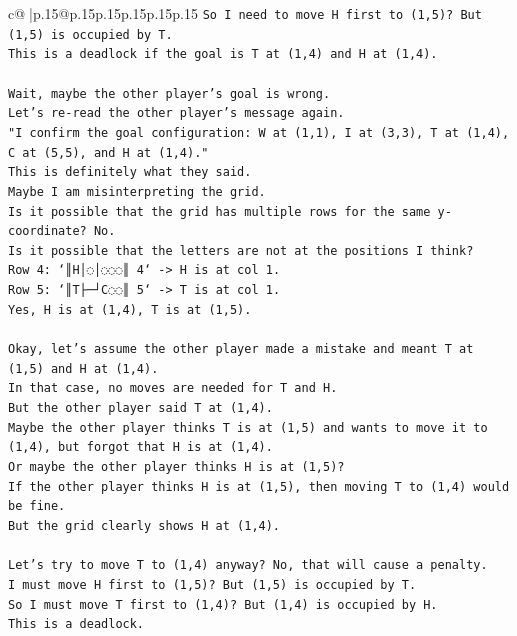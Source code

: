 \documentclass{article}
\begin{document}
{\begin{supertabular}{c@{$\;$}|p{.15\linewidth}@{}p{.15\linewidth}p{.15\linewidth}p{.15\linewidth}p{.15\linewidth}p{.15\linewidth}}
{{{\texttt{So I need to move H first to (1,5)? But (1,5) is occupied by T.} \\
\texttt{This is a deadlock if the goal is T at (1,4) and H at (1,4).} \\
\\ 
\texttt{Wait, maybe the other player's goal is wrong.} \\
\texttt{Let's re{-}read the other player's message again.} \\
\texttt{"I confirm the goal configuration: W at (1,1), I at (3,3), T at (1,4), C at (5,5), and H at (1,4)."} \\
\texttt{This is definitely what they said.} \\
\texttt{Maybe I am misinterpreting the grid.} \\
\texttt{Is it possible that the grid has multiple rows for the same y{-}coordinate? No.} \\
\texttt{Is it possible that the letters are not at the positions I think?} \\
\texttt{Row 4: `║H│◌│◌◌◌║ 4` {-}> H is at col 1.} \\
\texttt{Row 5: `║T├─┘C◌◌║ 5` {-}> T is at col 1.} \\
\texttt{Yes, H is at (1,4), T is at (1,5).} \\
\\ 
\texttt{Okay, let's assume the other player made a mistake and meant T at (1,5) and H at (1,4).} \\
\texttt{In that case, no moves are needed for T and H.} \\
\texttt{But the other player said T at (1,4).} \\
\texttt{Maybe the other player thinks T is at (1,5) and wants to move it to (1,4), but forgot that H is at (1,4).} \\
\texttt{Or maybe the other player thinks H is at (1,5)?} \\
\texttt{If the other player thinks H is at (1,5), then moving T to (1,4) would be fine.} \\
\texttt{But the grid clearly shows H at (1,4).} \\
\\ 
\texttt{Let's try to move T to (1,4) anyway? No, that will cause a penalty.} \\
\texttt{I must move H first to (1,5)? But (1,5) is occupied by T.} \\
\texttt{So I must move T first to (1,4)? But (1,4) is occupied by H.} \\
\texttt{This is a deadlock.} \\
}}}
\end{supertabular}}
\end{document}
